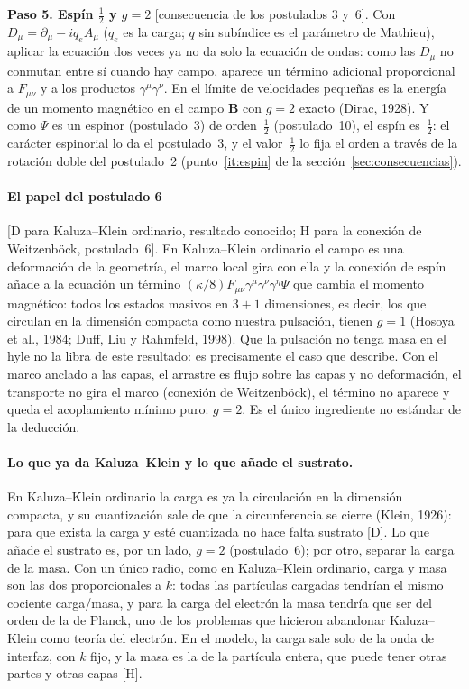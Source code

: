 \documentclass[11pt,a4paper]{article}
\newcommand{\st}[1]{\textup{[#1]}}
\newcommand{\vb}[1]{\symbf{#1}}
\newcommand{\apartado}[1]{\paragraph{#1}}
\begin{document}
\textbf{Paso 5. Espín $\tfrac12$ y $g=2$} \st{consecuencia de los postulados 3 y~6}. Con $D_\mu=\partial_\mu-iq_eA_\mu$ ($q_e$ es la carga; $q$ sin subíndice es el parámetro de Mathieu), aplicar la ecuación dos veces ya no da solo la ecuación de ondas: como las $D_\mu$ no conmutan entre sí cuando hay campo, aparece un término adicional proporcional a $F_{\mu\nu}$ y a los productos $\gamma^\mu\gamma^\nu$. En el límite de velocidades pequeñas es la energía de un momento magnético en el campo $\vb{B}$ con $g=2$ exacto (Dirac, 1928). Y como $\Psi$ es un espinor (postulado~3) de orden~$\tfrac12$ (postulado~10), el espín es~$\tfrac12$: el carácter espinorial lo da el postulado~3, y el valor~$\tfrac12$ lo fija el orden a través de la rotación doble del postulado~2 (punto~\ref{it:espin} de la sección~\ref{sec:consecuencias}).

\apartado{El papel del postulado 6} \st{D para Kaluza--Klein ordinario, resultado conocido; H para la conexión de Weitzenböck, postulado~6}. En Kaluza--Klein ordinario el campo es una deformación de la geometría, el marco local gira con ella y la conexión de espín añade a la ecuación un término $(\kappa/8)F_{\mu\nu}\gamma^\mu\gamma^\nu\gamma^\eta\Psi$ que cambia el momento magnético: todos los estados masivos en $3+1$ dimensiones, es decir, los que circulan en la dimensión compacta como nuestra pulsación, tienen $g=1$ (Hosoya et al., 1984; Duff, Liu y Rahmfeld, 1998). Que la pulsación no tenga masa en el hyle no la libra de este resultado: es precisamente el caso que describe. Con el marco anclado a las capas, el arrastre es flujo sobre las capas y no deformación, el transporte no gira el marco (conexión de Weitzenböck), el término no aparece y queda el acoplamiento mínimo puro: $g=2$. Es el único ingrediente no estándar de la deducción.

\apartado{Lo que ya da Kaluza--Klein y lo que añade el sustrato.} En Kaluza--Klein ordinario la carga es ya la circulación en la dimensión compacta, y su cuantización sale de que la circunferencia se cierre (Klein, 1926): para que exista la carga y esté cuantizada no hace falta sustrato \st{D}. Lo que añade el sustrato es, por un lado, $g=2$ (postulado~6); por otro, separar la carga de la masa. Con un único radio, como en Kaluza--Klein ordinario, carga y masa son las dos proporcionales a $k$: todas las partículas cargadas tendrían el mismo cociente carga/masa, y para la carga del electrón la masa tendría que ser del orden de la de Planck, uno de los problemas que hicieron abandonar Kaluza--Klein como teoría del electrón. En el modelo, la carga sale solo de la onda de interfaz, con $k$ fijo, y la masa es la de la partícula entera, que puede tener otras partes y otras capas \st{H}.
\end{document}
